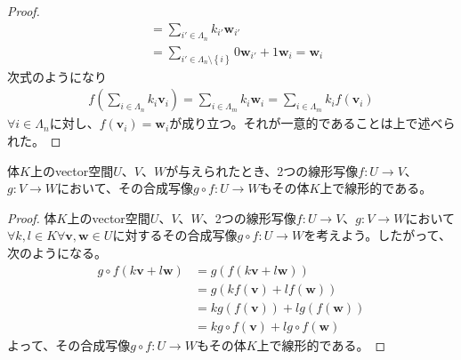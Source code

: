 \documentclass[dvipdfmx]{jsarticle}
\begin{document}
\begin{proof}
\begin{align*}
&= \sum_{i' \in \varLambda_{n}} {k_{i'}\mathbf{w}_{i'}}\\
&= \sum_{i' \in \varLambda_{n} \setminus \left\{ i \right\}} {0\mathbf{w}_{i'}} + 1\mathbf{w}_{i} = \mathbf{w}_{i}
\end{align*}
次式のようになり
\begin{align*}
f\left( \sum_{i \in \varLambda_{n}} {k_{i}\mathbf{v}_{i}} \right) = \sum_{i \in \varLambda_{m}} {k_{i}\mathbf{w}_{i}} = \sum_{i \in \varLambda_{m}} {k_{i}f\left( \mathbf{v}_{i} \right)}
\end{align*}
$\forall i \in \varLambda_{n}$に対し、$f\left( \mathbf{v}_{i} \right) = \mathbf{w}_{i}$が成り立つ。それが一意的であることは上で述べられた。
\end{proof}
\begin{thm}\label{2.1.2.3}
体$K$上のvector空間$U$、$V$、$W$が与えられたとき、2つの線形写像$f:U \rightarrow V$、$g:V \rightarrow W$において、その合成写像$g \circ f:U \rightarrow W$もその体$K$上で線形的である。
\end{thm}
\begin{proof}
体$K$上のvector空間$U$、$V$、$W$、2つの線形写像$f:U \rightarrow V$、$g:V \rightarrow W$において$\forall k,l \in K\forall\mathbf{v},\mathbf{w} \in U$に対するその合成写像$g \circ f:U \rightarrow W$を考えよう。したがって、次のようになる。
\begin{align*}
g \circ f\left( k\mathbf{v} + l\mathbf{w} \right) &= g\left( f\left( k\mathbf{v} + l\mathbf{w} \right) \right)\\
&= g\left( kf\left( \mathbf{v} \right) + lf\left( \mathbf{w} \right) \right)\\
&= kg\left( f\left( \mathbf{v} \right) \right) + lg\left( f\left( \mathbf{w} \right) \right)\\
&= kg \circ f\left( \mathbf{v} \right) + lg \circ f\left( \mathbf{w} \right)
\end{align*}
よって、その合成写像$g \circ f:U \rightarrow W$もその体$K$上で線形的である。
\end{proof}
\end{document}
